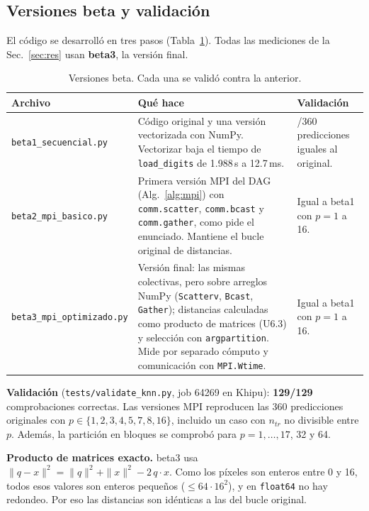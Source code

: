 \documentclass[11pt,a4paper]{article}
\newcommand{\ntr}{n_{tr}}
\begin{document}
\subsection{Versiones beta y validación}\label{sec:betas}
El código se desarrolló en tres pasos (Tabla~\ref{tab:betas}). Todas las mediciones de la Sec.~\ref{sec:res} usan \textbf{beta3}, la versión final.

\begin{table}[htbp]
\centering\small
\caption{Versiones beta. Cada una se validó contra la anterior.}\label{tab:betas}
\begin{tabularx}{\linewidth}{@{}>{\raggedright\arraybackslash}p{3.55cm}>{\raggedright\arraybackslash}X>{\raggedright\arraybackslash}p{3.3cm}@{}}\toprule
Archivo & Qué hace & Validación\\\midrule
\texttt{beta1\_secuencial.py} & Código original y una versión vectorizada con NumPy. Vectorizar baja el tiempo de \texttt{load\_digits} de 1.988\,s a 12.7\,ms. & 360/360 predicciones iguales al original.\\\addlinespace
\texttt{beta2\_mpi\_basico.py} & Primera versión MPI del DAG (Alg.~\ref{alg:mpi}) con \texttt{comm.scatter}, \texttt{comm.bcast} y \texttt{comm.gather}, como pide el enunciado. Mantiene el bucle original de distancias. & Igual a beta1 con $p=1$ a 16.\\\addlinespace
\texttt{beta3\_mpi\_}\linebreak\texttt{optimizado.py} & Versión final: las mismas colectivas, pero sobre arreglos NumPy (\texttt{Scatterv}, \texttt{Bcast}, \texttt{Gather}); distancias calculadas como producto de matrices (U6.3) y selección con \texttt{argpartition}. Mide por separado cómputo y comunicación con \texttt{MPI.Wtime}. & Igual a beta1 con $p=1$ a 16.\\\bottomrule
\end{tabularx}
\end{table}

\textbf{Validación} (\texttt{tests/validate\_knn.py}, job 64269 en Khipu): \textbf{129/129} comprobaciones correctas. Las versiones MPI reproducen las 360 predicciones originales con $p\in\{1,2,3,4,5,7,8,16\}$, incluido un caso con $\ntr$ no divisible entre $p$. Además, la partición en bloques se comprobó para $p=1,\dots,17$, 32 y 64.

\textbf{Producto de matrices exacto.} beta3 usa $\|q-x\|^2=\|q\|^2+\|x\|^2-2\,q\cdot x$. Como los píxeles son enteros entre 0 y 16, todos esos valores son enteros pequeños ($\le64\cdot16^2$), y en \texttt{float64} no hay redondeo. Por eso las distancias son idénticas a las del bucle original.
\end{document}
